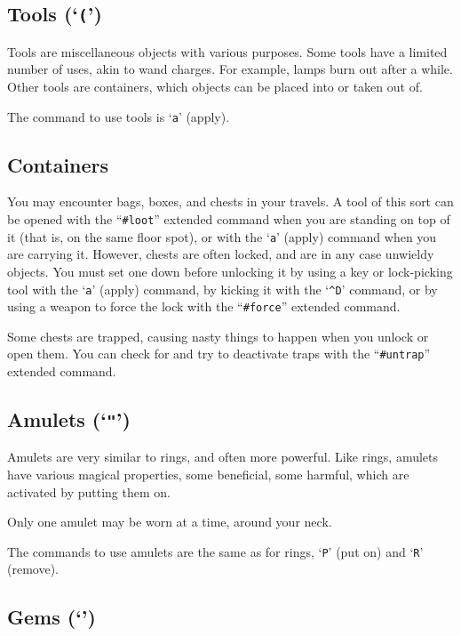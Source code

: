 \subsection*{Tools (`{\tt (}')}


Tools are miscellaneous objects with various purposes.  Some tools
have a limited number of uses, akin to wand charges.  For example, lamps burn
out after a while.  Other tools are containers, which objects can
be placed into or taken out of.

The command to use tools is `{\tt a}' (apply).
\subsection*{Containers}


You may encounter bags, boxes, and chests in your travels.  A tool of
this sort can be opened with the ``{\tt \#loot}'' extended command when
you are standing on top of it (that is, on the same floor spot),
or with the `{\tt a}' (apply) command when you are carrying it.  However,
chests are often locked, and are in any case unwieldy objects.
You must set one down before unlocking it by
using a key or lock-picking tool with the `{\tt a}' (apply) command,
by kicking it with the `{\tt \^{}D}' command,
or by using a weapon to force the lock with the ``{\tt \#force}'' extended command.

Some chests are trapped, causing nasty things to happen when you
unlock or open them.  You can check for and try to deactivate traps
with the ``{\tt \#untrap}'' extended command.
\subsection*{Amulets (`{\tt "}')}


Amulets are very similar to rings, and often more powerful.  Like
rings, amulets have various magical properties, some beneficial,
some harmful, which are activated by putting them on.

Only one amulet may be worn at a time, around your neck.

The commands to use amulets are the same as for rings, `{\tt P}' (put on)
and `{\tt R}' (remove).
\subsection*{Gems (`{\tt *}')}

